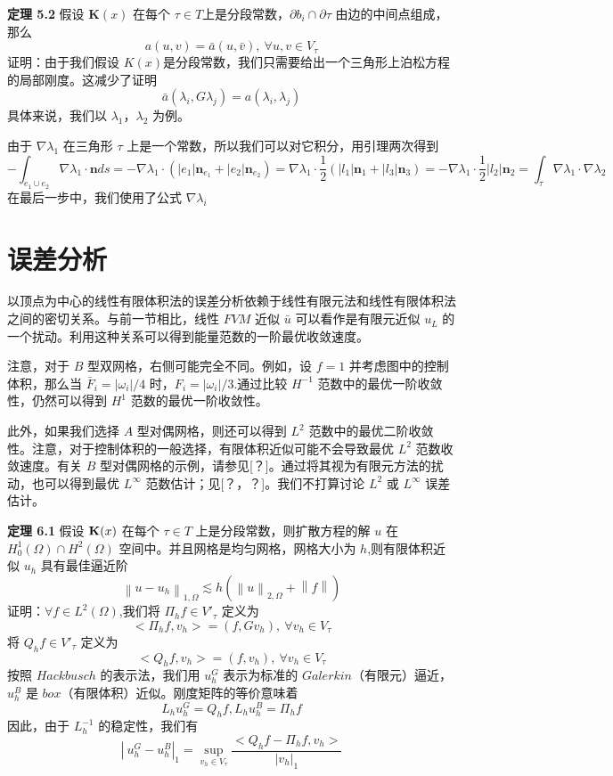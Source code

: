 \documentclass[12pt,a4paper]{article}
\begin{document}
\textbf{定理 5.2}
假设 $\textbf{K}(x)$ 在每个 $\tau\in T$上是分段常数，$\partial b_i \cap\partial\tau$ 由边的中间点组成，那么
$$
a(u,v)=\bar{a}(u,\bar{v}),~\forall u,v\in V_{\tau}
$$ 
证明：由于我们假设 $K(x)$是分段常数，我们只需要给出一个三角形上泊松方程的局部刚度。这减少了证明
$$
\bar{a}(\lambda_i,G\lambda_j)=a(\lambda_i,\lambda_j)
$$
具体来说，我们以 $\lambda_1$，$\lambda_2$ 为例。

由于 $\nabla\lambda _1$ 在三角形 $\tau$ 上是一个常数，所以我们可以对它积分，用引理两次得到
$$
-\int_{e_1\cup e_2}^{} \nabla\lambda _1\cdot\textbf{n}ds=-\nabla\lambda _1\cdot (|e_1|\textbf{n}_{e_1}+|e_2|\textbf{n}_{e_2})=\nabla\lambda _1\cdot \frac{1}{2}(|l_1|\textbf{n}_1+|l_3|\textbf{n}_3)=-\nabla\lambda _1\cdot \frac{1}{2}|l_2|\textbf{n}_2=\int_{\tau}^{} \nabla\lambda _1\cdot\nabla\lambda _2
$$
在最后一步中，我们使用了公式 $\nabla\lambda _i$

\section{误差分析}

以顶点为中心的线性有限体积法的误差分析依赖于线性有限元法和线性有限体积法之间的密切关系。与前一节相比，线性 $FVM$ 近似 $\bar{u}$ 可以看作是有限元近似 $u_L$ 的一个扰动。利用这种关系可以得到能量范数的一阶最优收敛速度。

注意，对于 $B$ 型双网格，右侧可能完全不同。例如，设 $f=1$ 并考虑图中的控制体积，那么当 $\bar{F}_i=|\omega_i|/4$ 时，$F_i=|\omega_i|/3$.通过比较 $H^{−1}$ 范数中的最优一阶收敛性，仍然可以得到 $H^1$ 范数的最优一阶收敛性。

此外，如果我们选择 $A$ 型对偶网格，则还可以得到 $L^2$ 范数中的最优二阶收敛性。注意，对于控制体积的一般选择，有限体积近似可能不会导致最优 $L^2$ 范数收敛速度。有关 $B$ 型对偶网格的示例，请参见[？]。通过将其视为有限元方法的扰动，也可以得到最优 $L^\infty$ 范数估计；见[？，？]。我们不打算讨论 $L^2$ 或 $L^\infty$ 误差估计。

\textbf{定理 6.1}
假设 $\textbf K(x)$ 在每个 $\tau\in T$ 上是分段常数，则扩散方程的解 $u$ 在 $H^1_0(\Omega)\cap H^2(\Omega)$ 空间中。并且网格是均匀网格，网格大小为 $h$,则有限体积近似 $u_h$ 具有最佳逼近阶
$$
\left \|u-u_h\right \|_{1,\Omega}\lesssim h(\left \|u\right \|_{2,\Omega}+\left \|f\right \|)
$$
证明：$\forall f\in L^2(\Omega)$,我们将 $\Pi_h f\in V'_{\tau}$ 定义为 
$$
<\Pi_h f,v_h> = (f,Gv_h) ,~\forall v_h\in V_{\tau}
$$
将 $Q_h f\in V'_{\tau}$ 定义为 
$$
<Q_h f,v_h> = (f,v_h) ,~\forall v_h\in V_{\tau}
$$
按照 $Hackbusch$ 的表示法，我们用 $u^G_h$ 表示为标准的 $Galerkin$（有限元）逼近，$u^B_h$ 是 $box$（有限体积）近似。刚度矩阵的等价意味着
$$
L_h u^G_h=Q_hf,L_h u^B_h=\Pi_h f
$$		
因此，由于 $L^{-1}_h$ 的稳定性，我们有
$$
\left| \ u^G_h-u^B_h \right|_1=\sup_{v_h\in V_{\tau}}\frac{<Q_h f-\Pi_h f,v_h>}{|v_h|_1}
$$
\end{document}
